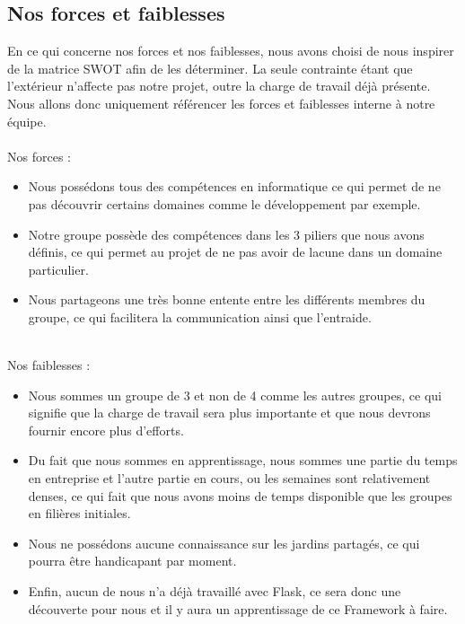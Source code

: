 \documentclass{tnreport}
\begin{document}
\subsection*{Nos forces et faiblesses}
\begin{sloppypar}
    En ce qui concerne nos forces et nos faiblesses, nous avons choisi de nous inspirer de la matrice SWOT afin de les déterminer. La seule contrainte étant que l'extérieur n'affecte pas notre projet, outre la charge de travail déjà présente. Nous allons donc uniquement référencer les forces et faiblesses interne à notre équipe.\\
    \\
    Nos forces : \\
    \begin{itemize}
        \item [\textbullet] Nous possédons tous des compétences en informatique ce qui permet de ne pas découvrir certains domaines comme le développement par exemple.
        \item [\textbullet] Notre groupe possède des compétences dans les 3 piliers que nous avons définis, ce qui permet au projet de ne pas avoir de lacune dans un domaine particulier.
        \item [\textbullet] Nous partageons une très bonne entente entre les différents membres du groupe, ce qui facilitera la communication ainsi que l'entraide.\\
    \end{itemize}
    \\
    Nos faiblesses : \\
    \begin{itemize}
        \item [\textbullet] Nous sommes un groupe de 3 et non de 4 comme les autres groupes, ce qui signifie que la charge de travail sera plus importante et que nous devrons fournir encore plus d'efforts.
        \item [\textbullet] Du fait que nous sommes en apprentissage, nous sommes une partie du temps en entreprise et l'autre partie en cours, ou les semaines sont relativement denses, ce qui fait que nous avons moins de temps disponible que les groupes en filières initiales.
        \item [\textbullet] Nous ne possédons aucune connaissance sur les jardins partagés, ce qui pourra être handicapant par moment.
        \item [\textbullet] Enfin, aucun de nous n'a déjà travaillé avec Flask, ce sera donc une découverte pour nous et il y aura un apprentissage de ce Framework à faire.\\
    \end{itemize}
\end{sloppypar}
\end{document}
